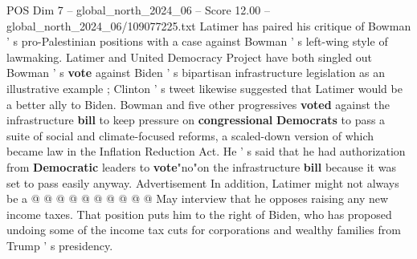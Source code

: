 \begin{textsample}{POS Dim 7 – global\_north\_2024\_06 – Score 12.00 – global\_north\_2024\_06/109077225.txt}
Latimer has paired his critique of Bowman ' s pro-Palestinian positions with a case against Bowman ' s left-wing style of lawmaking.
Latimer and United Democracy Project have both singled out Bowman ' s \textbf{vote} against Biden ' s bipartisan infrastructure legislation as an illustrative example ; Clinton ' s tweet likewise suggested that Latimer would be a better ally to Biden.
Bowman and five other progressives \textbf{voted} against the infrastructure \textbf{bill} to keep pressure on \textbf{congressional} \textbf{Democrats} to pass a suite of social and climate-focused reforms, a scaled-down version of which became law in the Inflation Reduction Act.
He ' s said that he had authorization from \textbf{Democratic} leaders to \textbf{vote}"no"on the infrastructure \textbf{bill} because it was set to pass easily anyway.
Advertisement In addition, Latimer might not always be a @ @ @ @ @ @ @ @ @ @ May interview that he opposes raising any new income taxes.
That position puts him to the right of Biden, who has proposed undoing some of the income tax cuts for corporations and wealthy families from Trump ' s presidency.

\end{textsample}
